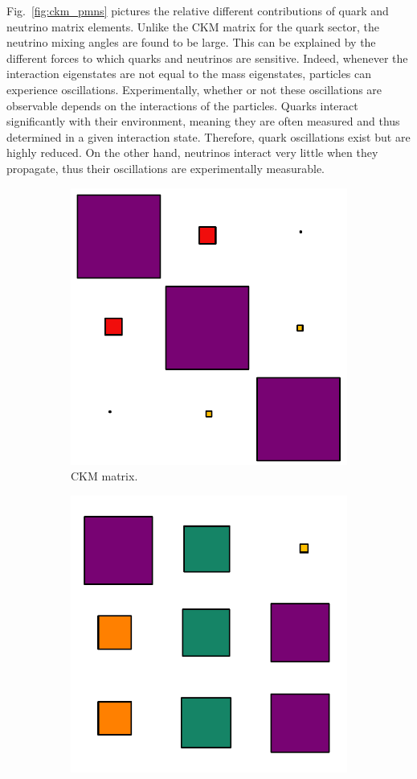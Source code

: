 Fig.~\ref{fig:ckm_pmns} pictures the relative different contributions of quark and neutrino matrix elements.
Unlike the CKM matrix for the quark sector, the neutrino mixing angles are found to be large.
This can be explained by the different forces to which quarks and neutrinos are sensitive.
Indeed, whenever the interaction eigenstates are not equal to the mass eigenstates, particles can experience oscillations.
Experimentally, whether or not these oscillations are observable depends on the interactions of the particles.
Quarks interact significantly with their environment, meaning they are often measured and thus determined in a given interaction state.
Therefore, quark oscillations exist but are highly reduced.
On the other hand, neutrinos interact very little when they propagate, thus their oscillations are experimentally measurable.
\begin{figure}[h]
  \centering
  \begin{subfigure}[t]{0.48\textwidth}
    \centering
    \includegraphics[height=0.7\textwidth]{neutrinophysics/fig_neutrinophysics/ckm_draw.pdf}
    \captionsetup{justification=justified}
    \caption{CKM matrix.
      \label{subfig:ckm}}
  \end{subfigure}
  \hfill
  \begin{subfigure}[t]{0.48\textwidth}
    \centering
    \includegraphics[height=0.7\textwidth]{neutrinophysics/fig_neutrinophysics/upmns_draw.pdf}

\end{subfigure}
\end{figure}
